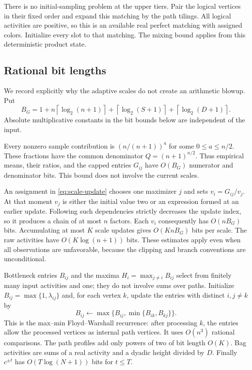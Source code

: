 \documentclass[11pt]{article}
\theoremstyle{definition}
\theoremstyle{remark}
\newcommand{\ceil}[1]{\left\lceil#1\right\rceil}
\numberwithin{equation}{section}
\begin{document}
There is no initial-sampling problem at the upper tiers. Pair the logical
vertices in their fixed order and expand this matching by the path
tilings. All logical activities are positive, so this is an available
real perfect matching with assigned colors. Initialize every slot to
that matching. The mixing bound applies from this deterministic product
state.

\subsection{Rational bit lengths}
We record explicitly why the adaptive scales do not create an
arithmetic blowup. Put
\begin{equation}\label{eq:empirical-bit-bound}
 B_G=1+n\ceil{\log_2(n+1)}+\ceil{\log_2(S+1)}
                      +\ceil{\log_2(D+1)}.
\end{equation}
Absolute multiplicative constants in the bit bounds below are
independent of the input.

Every nonzero sample contribution is $(n/(n+1))^a$ for some
$0\le a\le n/2$. These fractions have the common denominator
$Q=(n+1)^{n/2}$. Thus empirical means, their ratios, and the capped
entries $G_{ij}$ have $O(B_G)$ numerator and denominator bits. This
bound does not involve the current scales.

An assignment in \eqref{eq:scale-update} chooses one maximizer $j$ and
sets $v_i=G_{ij}/v_j$. At that moment $v_j$ is either the initial value
two or an expression formed at an earlier update. Following such
dependencies strictly decreases the update index, so it produces a
chain of at most $n$ factors. Each $v_i$ consequently has $O(nB_G)$
bits. Accumulating at most $K$ scale updates gives $O(KnB_G)$ bits per
scale. The raw activities have $O(K\log(n+1))$ bits. These estimates
apply even when all observations are unfavorable, because the clipping
and branch conventions are unconditional.

Bottleneck entries $B_{ij}$ and the maxima $H_i=\max_{j\ne i}B_{ij}$
select from finitely many input activities and one; they do not involve
sums over paths. Initialize $B_{ij}=\max\{1,\lambda_{ij}\}$ and,
for each vertex $k$, update the entries with distinct $i,j\ne k$ by
\[
 B_{ij}\leftarrow\max\{B_{ij},\min\{B_{ik},B_{kj}\}\}.
\]
This is the max--min Floyd--Warshall recurrence: after processing $k$,
the entries allow the processed vertices as internal path vertices.
It uses $O(n^3)$ rational comparisons. The path profiles add only powers of two of
bit length $O(K)$. Bag activities are sums of a real activity and a
dyadic height divided by $D$. Finally $c^{\pm t}$ has
$O(T\log(N+1))$ bits for $t\le T$.
\end{document}
